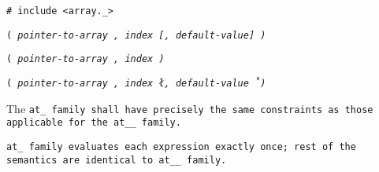 
\tt{# include <array._>}

\s\s\s\tt{(} \it{pointer-to-array} \tt{,}
\it{index}  [\tt{,} \it{default-value}] \tt{)}

\s\tt{(} \it{pointer-to-array} \tt{,}
\it{index} \tt{)}

\s\tt{(} \it{pointer-to-array} \tt{,}
\it{index} \l\tt{,} \it{default-value}\r\ \tt{)}


The \tt{at_} family shall have precisely the same
constraints as those applicable for the \tt{at__} family.


\tt{at_} family evaluates each expression exactly once;
rest of the semantics are identical to  \tt{at__} family.
